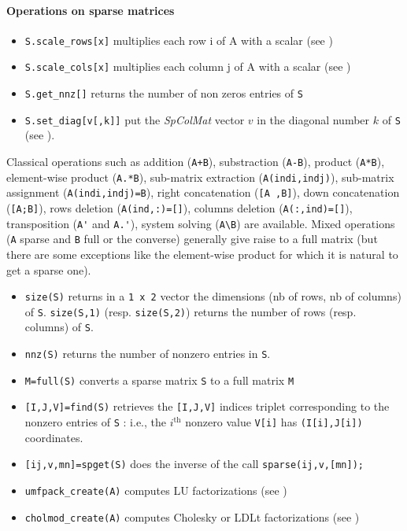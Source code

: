 \paragraph{Operations on sparse matrices}
\begin{itemize}
\item \verb+S.scale_rows[x]+ multiplies each row i of A with a scalar (see ) 
\item \verb+S.scale_cols[x]+ multiplies each column j of A with a scalar (see )
\item \verb+S.get_nnz[]+ returns the number of non zeros entries of \verb+S+ 
\item \verb+S.set_diag[v[,k]]+ put the \emph{SpColMat} vector $v$ in the diagonal number $k$ of \verb+S+
 (see ).

\end{itemize}


Classical operations such as addition (\verb-A+B-), substraction  (\verb+A-B+), product (\verb+A*B+), 
element-wise product (\verb+A.*B+), sub-matrix extraction (\verb+A(indi,indj)+), 
sub-matrix assignment (\verb+A(indi,indj)=B+), right concatenation  (\verb+[A ,B]+), 
down concatenation  (\verb+[A;B]+),  rows deletion (\verb+A(ind,:)=[]+), columns deletion (\verb+A(:,ind)=[]+), 
transposition (\verb+A'+ and \verb+A.'+),  system solving (\verb+A\B+) are available. 
Mixed operations (\verb+A+ sparse and \verb+B+ full or the converse) generally give raise to a 
full matrix (but there are some exceptions like the element-wise product for which it is natural 
to get a sparse one). 

\begin{itemize}
   \item \verb+size(S)+ returns in a \verb+1 x 2+ vector the dimensions (nb of rows, nb of columns)
of \verb+S+. \verb+size(S,1)+ (resp. \verb+size(S,2)+) returns the number of rows 
(resp. columns) of \verb+S+.
    \item \verb+nnz(S)+ returns the number of nonzero entries in \verb+S+.
    \item \verb+M=full(S)+ converts a sparse matrix \verb+S+ to a full matrix \verb+M+ 
    \item \verb+[I,J,V]=find(S)+ retrieves the \verb+[I,J,V]+ indices triplet 
corresponding to the nonzero entries of \verb+S+ : i.e., the $i^{\mbox{th}}$ nonzero
value \verb+V[i]+ has \verb+(I[i],J[i])+ coordinates.
    \item \verb+[ij,v,mn]=spget(S)+ does the inverse of the call \verb+sparse(ij,v,[mn]);+ 
    \item \verb+umfpack_create(A)+ computes LU factorizations (see )
    \item \verb+cholmod_create(A)+ computes Cholesky or LDLt factorizations (see
      )
\end{itemize}

